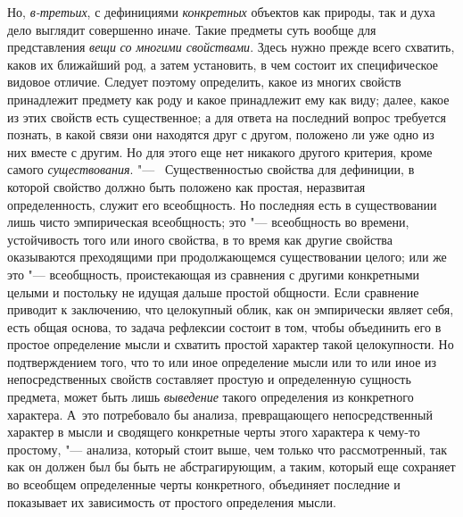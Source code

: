 {{Но, {\em в-третьих},
с дефинициями
{\em конкретных} объектов
как природы, так и духа дело выглядит совершенно иначе. Такие предметы суть
вообще для представления {\em вещи}
{\em со многими свойствами}.
Здесь нужно прежде всего схватить, каков их ближайший род, а
затем установить, в чем состоит их специфическое видовое отличие. Следует
поэтому определить, какое из многих свойств принадлежит предмету как роду и
какое принадлежит ему как виду; далее, какое из этих свойств есть
существенное; а для ответа на последний вопрос требуется познать, в какой
связи они находятся друг с другом, положено ли уже одно из них вместе с
другим. Но для этого еще нет никакого другого критерия, кроме самого
{\em существования}. "---
~Существенностью свойства для дефиниции, в которой свойство
должно быть положено как простая, неразвитая определенность, служит его
всеобщность. Но последняя есть в существовании лишь чисто эмпирическая
всеобщность; это "--- всеобщность во времени, устойчивость того
или иного свойства, в то время как другие свойства оказываются преходящими
при продолжающемся существовании целого; или же это
"--- всеобщность, проистекающая из сравнения с другими
конкретными целыми и постольку не идущая дальше простой общности. Если
сравнение приводит к заключению, что целокупный облик, как
он эмпирически являет себя, есть общая основа, то задача рефлексии состоит
в том, чтобы объединить его в простое определение мысли и схватить простой
характер такой целокупности. Но подтверждением того, что то или иное
определение мысли или то или иное из непосредственных свойств составляет
простую и определенную сущность предмета, может быть лишь
{\em выведение} такого
определения из конкретного характера. А~это потребовало бы анализа,
превращающего непосредственный характер в мысли и сводящего конкретные
черты этого характера к чему-то простому, "--- анализа, который
стоит выше, чем только что рассмотренный, так как он должен был бы быть не
абстрагирующим, а таким, который еще сохраняет во всеобщем определенные
черты конкретного, объединяет последние и показывает их зависимость от
простого определения мысли.

}}
